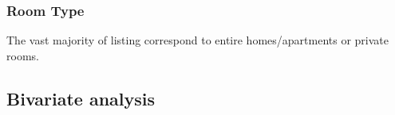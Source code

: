\pagebreak
\subsubsection{Room Type}


The vast majority of listing correspond to entire homes/apartments or private rooms.

\pagebreak
\subsection{Bivariate analysis}%
\label{sub:bivariate_analysis}


